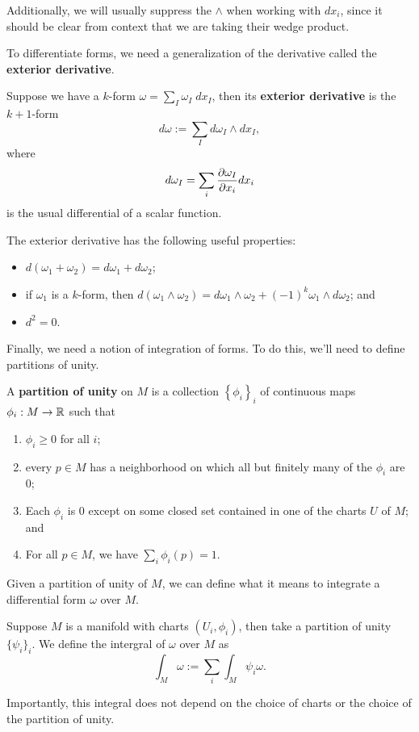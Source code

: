 \documentclass[twoside,10pt]{article}
\begin{document}
Additionally, we will usually suppress the $\wedge$ when working with $dx_i$, since it should be clear from context that we are taking their wedge product.

To differentiate forms, we need a generalization of the derivative called the \textbf{exterior derivative}.

\begin{defn}[]
Suppose we have a $k$-form $\omega = \sum_{I} \omega_I \; dx_I$, then its \textbf{exterior derivative} is the $k+1$-form
\[
	d\omega := \sum_{I} d\omega_I \wedge dx_I,
\] where
\[
d\omega_I = \sum_i \frac{\partial \omega_I}{\partial x_i} dx_i
\] is the usual differential of a scalar function.
\end{defn}

The exterior derivative has the following useful properties:
\begin{itemize}
	\item $d(\omega_1+\omega_2) = d\omega_1 + d\omega_2$;
	\item if $\omega_1$ is a $k$-form, then $d(\omega_1\wedge \omega_2) = d\omega_1 \wedge \omega_2 + (-1)^{k}\omega_1 \wedge d\omega_2$; and
	\item $d^2 = 0$.
\end{itemize}

Finally, we need a notion of integration of forms. To do this, we'll need to define partitions of unity.

\begin{defn}[]
A \textbf{partition of unity} on $M$ is a collection $\left\{ \phi_i \right\}_{i}$ of continuous maps $\phi_i : M \to \mathbb{R}$ such that
\begin{enumerate}
	\item $\phi_i \geq 0$ for all $i$;
	\item every $p \in M$ has a neighborhood on which all but finitely many of the $\phi_i$ are 0;
	\item Each $\phi_i$ is 0 except on some closed set contained in one of the charts $U$ of $M$; and
	\item For all $p \in M$, we have $\sum_i \phi_i (p) = 1$.
\end{enumerate}
\end{defn}

Given a partition of unity of $M$, we can define what it means to integrate a differential form $\omega$ over $M$.

\begin{defn}[]
Suppose $M$ is a manifold with charts $(U_i, \phi_i)$, then take a partition of unity $\{\psi_i\}_i$. We define the intergral of $\omega$ over $M$ as
\[
\int_{M} \omega := \sum_i \int_{M} \psi_i \omega.
\] 
\end{defn}
Importantly, this integral does not depend on the choice of charts or the choice of the partition of unity.
\end{document}
